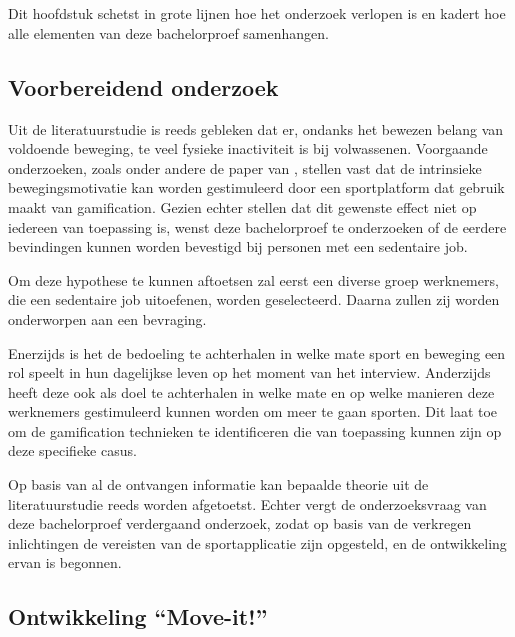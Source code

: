 
\chapter{}%
\label{ch:methodologie}

Dit hoofdstuk schetst in grote lijnen hoe het onderzoek verlopen is en kadert hoe alle elementen van deze bachelorproef samenhangen.

\section{Voorbereidend onderzoek}
Uit de literatuurstudie is reeds gebleken dat er, ondanks het bewezen belang van voldoende beweging, te veel fysieke inactiviteit is bij volwassenen. Voorgaande onderzoeken, zoals onder andere de paper van \textcite{Kari2016}, stellen vast dat de intrinsieke bewegingsmotivatie kan worden gestimuleerd door een sportplatform dat gebruik maakt van gamification. Gezien \textcite{Hamari2013} echter stellen dat dit gewenste effect niet op iedereen van toepassing is, wenst deze bachelorproef te onderzoeken of de eerdere bevindingen kunnen worden bevestigd bij personen met een sedentaire job.

Om deze hypothese te kunnen aftoetsen zal eerst een diverse groep werknemers, die een sedentaire job uitoefenen, worden geselecteerd. Daarna zullen zij worden onderworpen aan een bevraging.

Enerzijds is het de bedoeling te achterhalen in welke mate sport en beweging een rol speelt in hun dagelijkse leven op het moment van het interview. Anderzijds heeft deze ook als doel te achterhalen in welke mate en op welke manieren deze werknemers gestimuleerd kunnen worden om meer te gaan sporten. Dit laat toe om de gamification technieken te identificeren die van toepassing kunnen zijn op deze specifieke casus.

Op basis van al de ontvangen informatie kan bepaalde theorie uit de literatuurstudie reeds worden afgetoetst. Echter vergt de onderzoeksvraag van deze bachelorproef verdergaand onderzoek, zodat op basis van de verkregen inlichtingen de vereisten van de sportapplicatie zijn opgesteld, en de ontwikkeling ervan is begonnen.

\section{Ontwikkeling ``Move-it!''}

